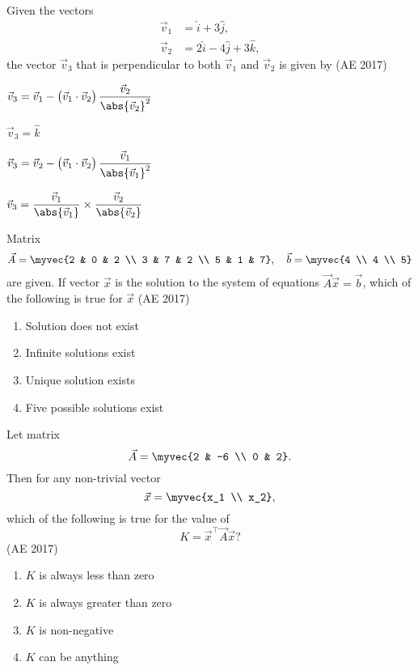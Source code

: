 \item
Given the vectors 
\begin{align*}
\vec{v}_{1} &= \hat{i}+3\hat{j}, \\
\vec{v}_{2} &= 2\hat{i}-4\hat{j}+3\hat{k},
\end{align*}
the vector $\vec{v}_{3}$ that is perpendicular to both $\vec{v}_{1}$ and $\vec{v}_{2}$ is given by
\hfill (AE 2017)
\begin{enumerate}
\begin{multicols}{2}
\item $\vec{v}_{3}=\vec{v}_{1}-\big(\vec{v}_{1}\cdot \vec{v}_{2}\big)\,\dfrac{\vec{v}_{2}}{\abs{\vec{v}_{2}}^{2}}$
\item $\vec{v}_{3}=\hat{k}$
\item $\vec{v}_{3}=\vec{v}_{2}-\big(\vec{v}_{1}\cdot \vec{v}_{2}\big)\,\dfrac{\vec{v}_{1}}{\abs{\vec{v}_{1}}^{2}}$
\item $\vec{v}_{3}=\dfrac{\vec{v}_{1}}{\abs{\vec{v}_{1}}}\times\dfrac{\vec{v}_{2}}{\abs{\vec{v}_{2}}}$
\end{multicols}
\end{enumerate}
\item Matrix 
\[
\vec{A} = \myvec{2 & 0 & 2 \\ 3 & 7 & 2 \\ 5 & 1 & 7}, \quad 
\vec{b} = \myvec{4 \\ 4 \\ 5}
\]  
are given. If vector $\vec{x}$ is the solution to the system of equations $\vec{A} \vec{x} = \vec{b}$, which of the following is true for $\vec{x}$
\hfill (AE 2017)
\begin{multicols}{2}
\begin{enumerate}
\item Solution does not exist
\item Infinite solutions exist
\item Unique solution exists
\item Five possible solutions exist
\end{enumerate}
\end{multicols}
\item Let matrix 
\[
\vec{A} = \myvec{2 & -6 \\ 0 & 2}.
\]  
Then for any non-trivial vector 
\[
\vec{x} = \myvec{x_1 \\ x_2},
\]  
which of the following is true for the value of  
\[
K = \vec{x}^{\top} \vec{A} \vec{x} ?
\]  
\hfill (AE 2017)
\begin{multicols}{2}
\begin{enumerate}
\item $K$ is always less than zero
\item $K$ is always greater than zero
\item $K$ is non-negative
\item $K$ can be anything
\end{enumerate}
\end{multicols}

